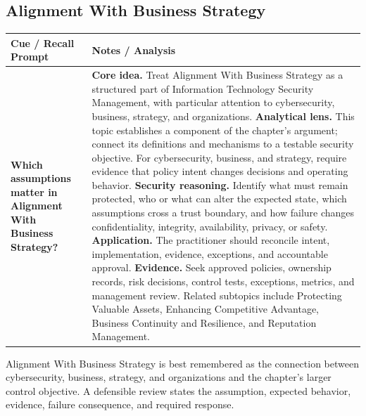 \documentclass[11pt]{article}
\newcommand{\CornellHeader}{%
\rowcolor{Navy}\color{white}\bfseries Cue / Recall Prompt & \color{white}\bfseries Notes / Analysis\\\hline}
\newcommand{\CornellRow}[2]{%
\cellcolor{CueGray}\RaggedRight\textbf{#1} & \RaggedRight #2\\\hline}
\begin{document}
\subsection*{Alignment With Business Strategy}
\begin{longtable}{>{\RaggedRight\arraybackslash}p{}|>{\RaggedRight\arraybackslash}p{}}
\CornellHeader
\CornellRow{Which assumptions matter in Alignment With Business Strategy?}{\textbf{Core idea.} Treat Alignment With Business Strategy as a structured part of Information Technology Security Management, with particular attention to cybersecurity, business, strategy, and organizations. \textbf{Analytical lens.} This topic establishes a component of the chapter's argument; connect its definitions and mechanisms to a testable security objective. For cybersecurity, business, and strategy, require evidence that policy intent changes decisions and operating behavior. \textbf{Security reasoning.} Identify what must remain protected, who or what can alter the expected state, which assumptions cross a trust boundary, and how failure changes confidentiality, integrity, availability, privacy, or safety. \textbf{Application.} The practitioner should reconcile intent, implementation, evidence, exceptions, and accountable approval. \textbf{Evidence.} Seek approved policies, ownership records, risk decisions, control tests, exceptions, metrics, and management review. Related subtopics include Protecting Valuable Assets, Enhancing Competitive Advantage, Business Continuity and Resilience, and Reputation Management.}
\end{longtable}
\begin{topicsummary}
Alignment With Business Strategy is best remembered as the connection between cybersecurity, business, strategy, and organizations and the chapter's larger control objective. A defensible review states the assumption, expected behavior, evidence, failure consequence, and required response.
\end{topicsummary}
\end{document}
